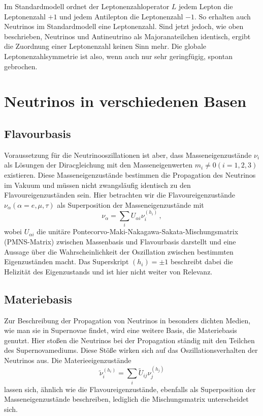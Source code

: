 Im Standardmodell ordnet der Leptonenzahloperator $L$ jedem Lepton die Leptonenzahl $+1$ und jedem Antilepton die Leptonenzahl $-1$.
So erhalten auch Neutrinos im Standardmodell eine Leptonenzahl. 
Sind jetzt jedoch, wie oben beschrieben, Neutrinos und Antineutrino als Majoranateilchen identisch, ergibt die Zuordnung einer Leptonenzahl keinen Sinn mehr.
Die globale Leptonenzahlsymmetrie ist also, wenn auch nur sehr geringfügig, spontan gebrochen.

\section{Neutrinos in verschiedenen Basen}
\label{sec:neutrinobasen}

\subsection{Flavourbasis} %
\label{subsec:flavourbasis}
Voraussetzung für die Neutrinooszillationen ist aber, dass Masseneigenzustände $\nu_i$ als Lösungen der Diracgleichung mit den Masseneigenwerten $m_i \neq 0 (i = 1, 2, 3)$ existieren.
Diese Masseneigenzustände bestimmen die Propagation des Neutrinos im Vakuum und müssen nicht zwangsläufig identisch zu den Flavoureigenzuständen sein.
Hier betrachten wir die Flavoureigenzustände $\nu_\alpha (\alpha = e, \mu, \tau)$ als Superposition der Masseneigenzustände mit
\begin{equation}
    \nu_\alpha = \sum_i U_{\alpha i} \nu^{(h_i)}_i \,,
    \label{eq:flavourbasis}
\end{equation}
wobei $U_{\alpha i}$ die unitäre Pontecorvo-Maki-Nakagawa-Sakata-Mischungsmatrix (PMNS-Matrix) zwischen Massenbasis und Flavourbasis darstellt und eine Aussage über die Wahrscheinlichkeit der Oszillation zwischen bestimmten Eigenzuständen macht.
Das Superskript $(h_i) = \pm 1$ beschreibt dabei die Helizität des Eigenzustands und ist hier nicht weiter von Relevanz.


\subsection{Materiebasis} %
\label{subsec:materiebasis}

Zur Beschreibung der Propagation von Neutrinos in besonders dichten Medien, wie man sie in Supernovae findet, wird eine weitere Basis, die Materiebasis genutzt.
Hier stoßen die Neutrinos bei der Propagation ständig mit den Teilchen des Supernovamediums.
Diese Stöße wirken sich auf das Oszillationsverhalten der Neutrinos aus.
Die Materieeigenzustände
\begin{equation}
    \tilde{\nu}^{(h_i)}_i = \sum_i \tilde{U}_{i j} \nu^{(h_j)}_j
    \label{eq:materiebasis}
\end{equation} 
lassen sich, ähnlich wie die Flavoureigenzustände, ebenfalls als Superposition der Masseneigenzustände beschreiben, lediglich die Mischungsmatrix unterscheidet sich.

